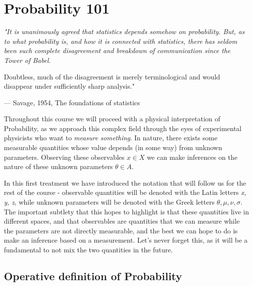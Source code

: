 \chapter{Probability 101}
\label{chap:prob}

\vspace*{2cm}

\begin{center}
	\itshape
	"It is unanimously agreed that statistics
	depends somehow on probability. But, as to
	what probability is, and how it is connected
	with statistics, there has seldom been such
	complete disagreement and breakdown of
	communication since the Tower of Babel.
	
	
	Doubtless, much of the disagreement is
	merely terminological and would disappear
	under sufficiently sharp analysis."
	
	\vspace{0.5em}
	--- Savage, 1954, The foundations of statistics
\end{center}

\vspace{2cm}


Throughout this course we will proceed with a physical interpretation of Probability, as we approach this complex field through the eyes of experimental physicists who want to \emph{measure something}. In nature, there exists some measurable quantities whose value depends (in some way) from unknown parameters. Observing these observables $x\in X$ we can make inferences on the nature of these unknown parameters $\theta\in A$. 

In this first treatment we have introduced the notation that will follow us for the rest of the course - observable quantities will be denoted with the Latin letters \emph{x, y, z}, while unknown parameters will be denoted with the Greek letters \emph{$\theta, \mu, \nu, \sigma$}. The important subtlety that this hopes to highlight is that these quantities live in different spaces, and that observables are quantities that we can measure while the parameters are not directly measurable, and the best we can hope to do is make an inference based on a measurement. Let's never forget this, as it will be a fundamental to not mix the two quantities in the future. 



\section{Operative definition of Probability}
\label{sec:prob_def}


